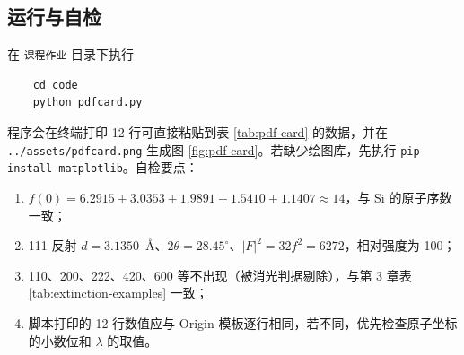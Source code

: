     

    \subsection{运行与自检}

    在 \texttt{课程作业} 目录下执行
    \begin{lstlisting}
    cd code
    python pdfcard.py
    \end{lstlisting}
    程序会在终端打印 12 行可直接粘贴到表 \ref{tab:pdf-card} 的数据，并在 \texttt{../assets/pdfcard.png} 生成图 \ref{fig:pdf-card}。若缺少绘图库，先执行 \texttt{pip install matplotlib}。自检要点：
    \begin{enumerate}[label=（\arabic*）,leftmargin=2.2em,itemsep=1pt]
      \item $f(0)=6.2915+3.0353+1.9891+1.5410+1.1407\approx14$，与 Si 的原子序数一致；
      \item 111 反射 $d=3.1350$~\AA、$2\theta=28.45^\circ$、$|F|^2=32f^2=6272$，相对强度为 100；
      \item 110、200、222、420、600 等不出现（被消光判据剔除），与第 3 章表 \ref{tab:extinction-examples} 一致；
      \item 脚本打印的 12 行数值应与 Origin 模板逐行相同，若不同，优先检查原子坐标的小数位和 $\lambda$ 的取值。
    \end{enumerate}

